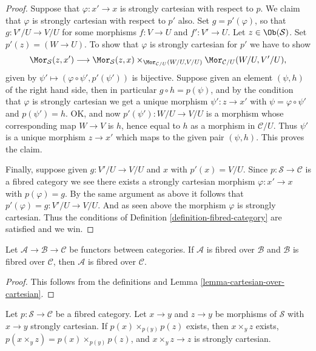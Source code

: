 \begin{proof}
Suppose that $\varphi : x' \to x$ is strongly cartesian with respect to $p$.
We claim that $\varphi$ is strongly cartesian with respect to $p'$ also.
Set $g = p'(\varphi)$, so that $g : V'/U \to V/U$
for some morphisms $f : V \to U$ and $f' : V' \to U$.
Let $z \in \Ob(\mathcal{S})$. Set $p'(z) = (W \to U)$.
To show that $\varphi$ is strongly cartesian for $p'$ we have to show
$$
\Mor_\mathcal{S}(z, x')
\longrightarrow
\Mor_\mathcal{S}(z, x)
\times_{\Mor_{\mathcal{C}/U}(W/U, V/U)}
\Mor_{\mathcal{C}/U}(W/U, V'/U),
$$
given by $\psi' \longmapsto (\varphi \circ \psi', p'(\psi'))$
is bijective. Suppose given an element $(\psi, h)$ of the
right hand side, then in particular $g \circ h = p(\psi)$,
and by the condition that $\varphi$ is strongly cartesian we
get a unique morphism $\psi' : z \to x'$ with $\psi = \varphi \circ \psi'$
and $p(\psi') = h$. OK, and now $p'(\psi') : W/U \to V/U$
is a morphism whose corresponding map $W \to V$ is $h$, hence
equal to $h$ as a morphism in $\mathcal{C}/U$. Thus $\psi'$ is
a unique morphism $z \to x'$ which maps to the given pair $(\psi, h)$.
This proves the claim.

\medskip\noindent
Finally, suppose given $g : V'/U \to V/U$ and $x$ with $p'(x) = V/U$.
Since $p : \mathcal{S} \to \mathcal{C}$ is a fibred category we
see there exists a strongly cartesian morphism $\varphi : x' \to x$
with $p(\varphi) = g$. By the same argument as above it follows
that $p'(\varphi) = g : V'/U \to V/U$. And as seen above the morphism
$\varphi$ is strongly cartesian. Thus the conditions of
Definition \ref{definition-fibred-category} are satisfied and we win.
\end{proof}

\begin{lemma}
\label{lemma-fibred-over-fibred}
Let $\mathcal{A} \to \mathcal{B} \to \mathcal{C}$ be functors between
categories. If $\mathcal{A}$ is fibred over $\mathcal{B}$ and
$\mathcal{B}$ is fibred over $\mathcal{C}$, then $\mathcal{A}$
is fibred over $\mathcal{C}$.
\end{lemma}

\begin{proof}
This follows from the definitions and
Lemma \ref{lemma-cartesian-over-cartesian}.
\end{proof}

\begin{lemma}
\label{lemma-fibred-category-representable-goes-up}
Let $p : \mathcal{S} \to \mathcal{C}$ be a fibred category.
Let $x \to y$ and $z \to y$ be morphisms of $\mathcal{S}$
with $x \to y$ strongly cartesian. If $p(x) \times_{p(y)} p(z)$ exists,
then $x \times_y z$ exists, $p(x \times_y z) = p(x) \times_{p(y)} p(z)$,
and $x \times_y z \to z$ is strongly cartesian.
\end{lemma}

